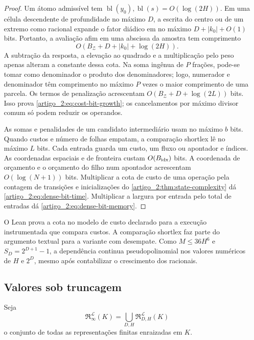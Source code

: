 \documentclass[12pt,a4paper]{article}
\theoremstyle{preciso}
\theoremstyle{definition}
\newcommand{\Library}{\mathcal{L}}
\newcommand{\Representations}{\mathfrak{R}}
\theoremstyle{preciso}
\theoremstyle{preciso}
\theoremstyle{preciso}
\theoremstyle{preciso}
\theoremstyle{definition}
\theoremstyle{preciso}
\theoremstyle{definition}
\theoremstyle{preciso}
\theoremstyle{preciso}
\theoremstyle{definition}
\newcounter{absc}
\begin{document}
\begin{proof}
Um átomo admissível tem $\operatorname{bl}(y_0),
\operatorname{bl}(s)=O(\log(2H))$. Em uma célula descendente de profundidade
no máximo $D$, a escrita do centro ou de um extremo como racional expande o fator
diádico em no máximo $D+|k_0|+O(1)$ bits. Portanto, a avaliação afim em uma
abscissa da amostra tem comprimento
\[
 O(B_{\mathcal Z}+D+|k_0|+\log(2H)).
\]
A subtração da resposta, a elevação ao quadrado e a multiplicação pelo peso apenas alteram
a constante dessa cota. Na soma ingênua de $P$ frações, pode-se tomar como
denominador o produto dos denominadores; logo, numerador e denominador têm
comprimento no máximo $P$ vezes o maior comprimento de uma parcela. Os termos
de penalização acrescentam $O(B_{\mathcal Z}+D+\log(2L))$ bits. Isso prova
\eqref{artigo_2:eq:cost-bit-growth}; os cancelamentos por máximo divisor comum só podem
reduzir os operandos.

As somas e penalidades de um candidato intermediário usam no máximo
$b$ bits. Quando custos e número de folhas empatam, a comparação shortlex
lê no máximo $L$ bits. Cada entrada guarda um custo, um fluxo ou apontador
e índices. As coordenadas espaciais e de fronteira custam
$O(B_{\rm idx})$ bits. A coordenada de orçamento e o orçamento do filho
num apontador acrescentam $O(\log(N+1))$ bits. Multiplicar a cota de custo de
uma operação pela contagem de transições e inicializações do
\cref{artigo_2:thm:state-complexity} dá \eqref{artigo_2:eq:dense-bit-time}.
Multiplicar a largura por entrada pelo total de entradas dá
\eqref{artigo_2:eq:dense-bit-memory}.
\end{proof}

O Lean prova a cota no modelo de custo declarado para a execução instrumentada
que compara custos. A comparação shortlex faz parte do argumento textual
para a variante com desempate. Como $M\le36H^6$ e $S_D=2^{D+1}-1$,
a dependência continua pseudopolinomial nos valores numéricos de $H$ e $2^D$,
mesmo após contabilizar o crescimento dos racionais.

\subsection{Valores sob truncagem}

Seja
\[
 \Representations_{\infty}^{\Library}(K)
 =\bigcup_{D,H}\Representations_{D,H}^{\Library}(K)
\]
o conjunto de todas as representações finitas enraizadas em $K$.
\end{document}
